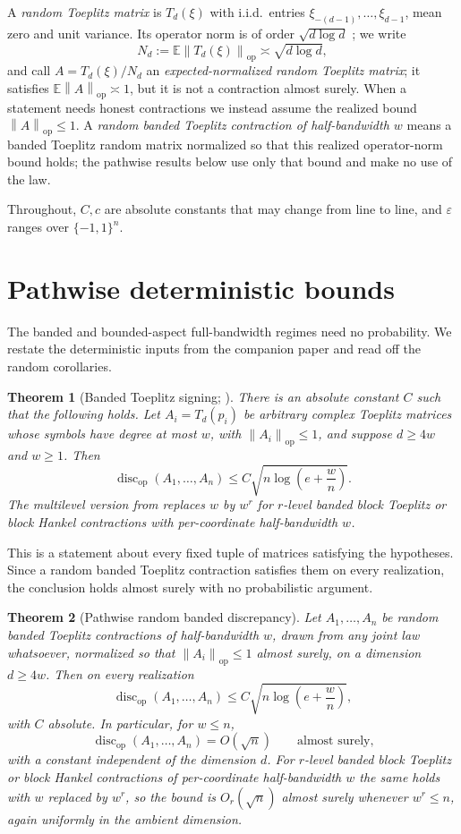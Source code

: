 \documentclass[11pt]{amsart}
\numberwithin{equation}{section}
\newtheorem{theorem}{Theorem}[section]
\theoremstyle{definition}
\theoremstyle{remark}
\newcommand{\op}{\mathrm{op}}
\newcommand{\discop}{\operatorname{disc}_{\op}}
\newcommand{\Exp}{\mathbb E}
\newcommand{\norm}[1]{\left\lVert #1\right\rVert}
\newcommand{\eps}{\varepsilon}
\begin{document}
A \emph{random Toeplitz matrix} is $T_d(\xi)$ with i.i.d.\ entries
$\xi_{-(d-1)},\ldots,\xi_{d-1}$, mean zero and unit variance. Its operator norm
is of order $\sqrt{d\log d}$ \cite{Meckes}; we write
\[
N_d:=\Exp\norm{T_d(\xi)}_{\op}\asymp\sqrt{d\log d},
\]
and call \(A=T_d(\xi)/N_d\) an \emph{expected-normalized random Toeplitz matrix};
it satisfies \(\Exp\norm{A}_{\op}\asymp1\), but it is not a contraction almost surely.
When a statement needs honest contractions we instead assume the realized bound
\(\norm{A}_{\op}\le1\). A \emph{random banded Toeplitz contraction of half-bandwidth
\(w\)} means a banded Toeplitz random matrix normalized so that this realized
operator-norm bound holds; the pathwise results below use only that bound and make no
use of the law.

Throughout, $C,c$ are absolute constants that may change from line to line, and
$\eps$ ranges over $\{-1,1\}^n$.

\section{Pathwise deterministic bounds}\label{sec:pathwise}

The banded and bounded-aspect full-bandwidth regimes need no probability. We
restate the deterministic inputs from the companion paper and read off the
random corollaries.

\begin{theorem}[Banded Toeplitz signing; {\cite{Shmalo-paper12}}]
\label{thm:band-input}
There is an absolute constant $C$ such that the following holds. Let
$A_i=T_d(p_i)$ be arbitrary complex Toeplitz matrices whose symbols have degree
at most $w$, with $\norm{A_i}_{\op}\le1$, and suppose $d\ge4w$ and $w\ge1$. Then
\[
\discop(A_1,\ldots,A_n)\le C\sqrt{n\log\left(e+\frac{w}{n}\right)} .
\]
The multilevel version from \cite{Shmalo-paper12} replaces \(w\) by \(w^r\) for
\(r\)-level banded block Toeplitz or block Hankel contractions with per-coordinate
half-bandwidth \(w\).
\end{theorem}

This is a statement about every fixed tuple of matrices satisfying the
hypotheses. Since a random banded Toeplitz contraction satisfies them on every
realization, the conclusion holds almost surely with no probabilistic argument.

\begin{theorem}[Pathwise random banded discrepancy]\label{thm:pathwise}
Let $A_1,\ldots,A_n$ be random banded Toeplitz contractions of half-bandwidth
$w$, drawn from any joint law whatsoever, normalized so that
$\norm{A_i}_{\op}\le1$ almost surely, on a dimension $d\ge4w$. Then on every
realization
\[
\discop(A_1,\ldots,A_n)\le C\sqrt{n\log\left(e+\frac{w}{n}\right)} ,
\]
with $C$ absolute. In particular, for $w\le n$,
\[
\discop(A_1,\ldots,A_n)=O(\sqrt n)\qquad\text{almost surely,}
\]
with a constant independent of the dimension $d$. For $r$-level banded block
Toeplitz or block Hankel contractions of per-coordinate half-bandwidth $w$ the
same holds with $w$ replaced by $w^r$, so the bound is $O_{r}(\sqrt n)$ almost
surely whenever $w^r\le n$, again uniformly in the ambient dimension.
\end{theorem}
\end{document}
